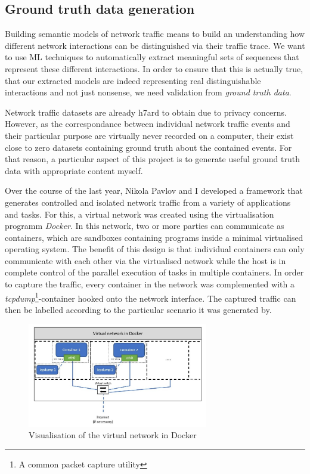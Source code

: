 \documentclass[a4paper,12pt,twoside]{report}
\begin{document}
\subsection{Ground truth data generation}\label{Groundtruth}

Building semantic models of network traffic means to build an understanding how different network interactions can be distinguished via their traffic trace. We want to use ML techniques to automatically extract meaningful sets of sequences that represent these different interactions. In order to ensure that this is actually true, that our extracted models are indeed representing real distinguishable interactions and not just nonsense, we need validation from \textit{ground truth data}. 

Network traffic datasets are already h7ard to obtain due to privacy concerns. However, as  the correspondance between individual network traffic events and their particular purpose are virtually never recorded on a computer, their exist close to zero datasets containing ground truth about the contained events. For that reason, a particular aspect of this project is to generate useful ground truth data with appropriate content myself.

Over the course of the last year, Nikola Pavlov and I developed a framework that generates controlled and isolated network traffic from a variety of applications and tasks. For this, a virtual network was created using the virtualisation programm \textit{Docker}. In this network, two or more parties can communicate as containers,  which are sandboxes containing programs inside a minimal virtualised operating system. The benefit of this design is that individual containers can only communicate with each other via the virtualised network while the host is in complete control of the parallel execution of tasks in multiple containers. In order to capture the traffic, every container in the network was complemented with a \textit{tcpdump}\footnote{A common packet capture utility}-container hooked onto the network interface. The captured traffic can then be labelled according to the particular scenario it was generated by.


\begin{figure}\label{graph}
\centering
\includegraphics[width=0.7\textwidth]{images/Dockernet.jpg}
\caption{Visualisation of the virtual network in Docker}
\end{figure}
\end{document}
